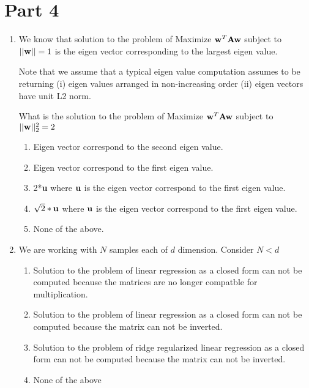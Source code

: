 \documentclass{article}
\begin{document}
\section{Part 4}
\begin{enumerate}
    \item We know that solution to the problem of Maximize ${\bf w}^T{\bf A}{\bf w}$ subject to $||{\bf w}|| = 1$ is the eigen vector corresponding to the largest eigen value.

    Note that we assume that a typical eigen value computation assumes to be returning (i) eigen values arranged in non-increasing order (ii) eigen vectors have unit L2 norm.

    What is the solution to the problem of
     Maximize ${\bf w}^T{\bf A}{\bf w}$ subject to $||{\bf w}||^2_2 = 2$

     \begin{enumerate}
         \item Eigen vector correspond to the second  eigen value.
         \item Eigen vector correspond to the first eigen value.
         \item 2*{\bf u} where ${\bf u}$ is the eigen vector correspond to the first eigen value.
         \item $\sqrt{2}*{\bf u}$ where ${\bf u}$ is the eigen vector correspond to the first eigen value.
         \item None of the above.
     \end{enumerate}


     \item We are working with $N$ samples each of $d$ dimension.
     Consider $N< d$

     \begin{enumerate}
         \item Solution to the problem of linear regression as a closed form can not be computed because the matrices are no longer compatble for multiplication.

         \item Solution to the problem of linear regression as a closed form can not be computed because the matrix can not be inverted.

         \item Solution to the problem of ridge regularized linear regression as a closed form can not be computed because the matrix can not be inverted.

         \item None of the above
     \end{enumerate}




\end{enumerate}
\end{document}
